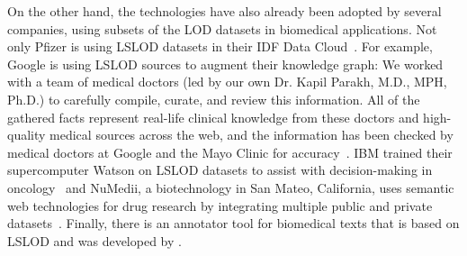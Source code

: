 \documentclass[runningheads]{llncs}
\newenvironment{nbquote} {\quote\interlinepenalty=10000 } {\endquote}
\begin{document}
    On the other hand, the technologies have also already been adopted by several companies, using subsets of the LOD datasets in biomedical applications.
    Not only Pfizer is using LSLOD datasets in their IDF Data Cloud~\citep{Pfizer}.
    For example, Google is using LSLOD sources to augment their knowledge graph:
    \begin{nbquote}
        We worked with a team of medical doctors (led by our own Dr. Kapil Parakh, M.D., MPH, Ph.D.) to carefully compile, curate, and review this information.
        All of the gathered facts represent real-life clinical knowledge from these doctors and high-quality medical sources across the web, and the information has been checked by medical doctors at Google and the Mayo Clinic for accuracy~\citep{Aremedyf53:online}.
    \end{nbquote}
    IBM trained their supercomputer Watson on LSLOD datasets to assist with decision-making in oncology~\citep{aocnp2015watson} and NuMedii, a biotechnology in San Mateo, California, uses semantic web technologies for drug research by integrating multiple public and private datasets~\cite{dastgheib2018accelerating}.
    Finally, there is an annotator tool for biomedical texts that is based on LSLOD and was developed by \citet{kamdar2020text}.


%
%
%
    
    
%
\end{document}
